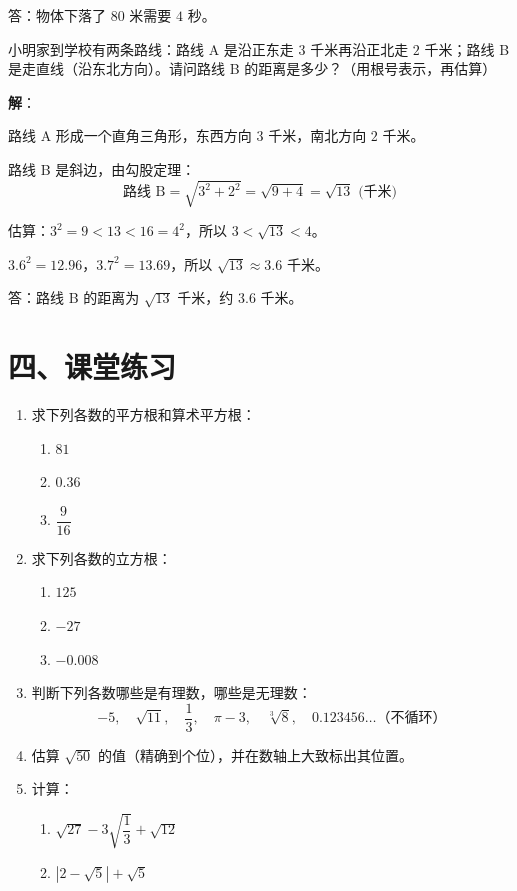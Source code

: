\documentclass[12pt, a4paper]{ctexart}
\begin{document}
答：物体下落了 $80$ 米需要 $4$ 秒。

\vspace{6pt}

\begin{appbox}[【应用4】比较大小的实际应用]
小明家到学校有两条路线：路线 A 是沿正东走 $3$ 千米再沿正北走 $2$ 千米；路线 B 是走直线（沿东北方向）。请问路线 B 的距离是多少？（用根号表示，再估算）
\end{appbox}

\textbf{解}：

路线 A 形成一个直角三角形，东西方向 $3$ 千米，南北方向 $2$ 千米。

路线 B 是斜边，由勾股定理：
\[
\text{路线 B} = \sqrt{3^2 + 2^2} = \sqrt{9 + 4} = \sqrt{13} \text{ (千米)}
\]

估算：$3^2 = 9 < 13 < 16 = 4^2$，所以 $3 < \sqrt{13} < 4$。

$3.6^2 = 12.96$，$3.7^2 = 13.69$，所以 $\sqrt{13} \approx 3.6$ 千米。

答：路线 B 的距离为 $\sqrt{13}$ 千米，约 $3.6$ 千米。

\section*{\textcolor{tipgreen}{四、课堂练习}}

\begin{enumerate}[leftmargin=2em]
  \item 求下列各数的平方根和算术平方根：
  \begin{enumerate}[label=(\arabic*)]
    \item $81$
    \item $0.36$
    \item $\dfrac{9}{16}$
  \end{enumerate}

  \item 求下列各数的立方根：
  \begin{enumerate}[label=(\arabic*)]
    \item $125$
    \item $-27$
    \item $-0.008$
  \end{enumerate}

  \item 判断下列各数哪些是有理数，哪些是无理数：
  \[
  -5,\quad \sqrt{11},\quad \frac{1}{3},\quad \pi - 3,\quad \sqrt[3]{8},\quad 0.123456\ldots\text{（不循环）}
  \]

  \item 估算 $\sqrt{50}$ 的值（精确到个位），并在数轴上大致标出其位置。

  \item 计算：
  \begin{enumerate}[label=(\arabic*)]
    \item $\sqrt{27} - 3\sqrt{\dfrac{1}{3}} + \sqrt{12}$
    \item $|2 - \sqrt{5}| + \sqrt{5}$
  \end{enumerate}
\end{enumerate}
\end{document}
